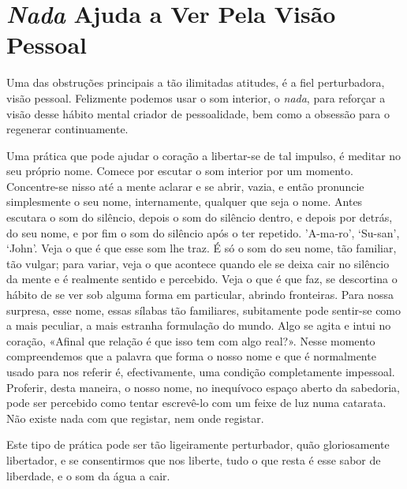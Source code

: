 \chapter{\emph{Nada} Ajuda a Ver Pela Visão Pessoal}

Uma das obstruções principais a tão ilimitadas atitudes, é a fiel
perturbadora, visão pessoal. Felizmente podemos usar o som interior, o
\emph{nada}, para reforçar a visão desse hábito mental criador de
pessoalidade, bem como a obsessão para o regenerar continuamente.

Uma prática que pode ajudar o coração a libertar-se de tal impulso, é
meditar no seu próprio nome. Comece por escutar o som interior por um
momento. Concentre-se nisso até a mente aclarar e se abrir, vazia, e
então pronuncie simplesmente o seu nome, internamente, qualquer que seja
o nome. Antes escutara o som do silêncio, depois o som do silêncio
dentro, e depois por detrás, do seu nome, e por fim o som do silêncio
após o ter repetido. 'A-ma-ro', `Su-san', `John'. Veja o que é que esse
som lhe traz. É só o som do seu nome, tão familiar, tão vulgar; para
variar, veja o que acontece quando ele se deixa cair no silêncio da
mente e é realmente sentido e percebido. Veja o que é que faz, se
descortina o hábito de se ver sob alguma forma em particular, abrindo
fronteiras. Para nossa surpresa, esse nome, essas sílabas tão
familiares, subitamente pode sentir-se como a mais peculiar, a mais
estranha formulação do mundo. Algo se agita e intui no coração, «Afinal
que relação é que isso tem com algo real?». Nesse momento compreendemos
que a palavra que forma o nosso nome e que é normalmente usado para nos
referir é, efectivamente, uma condição completamente impessoal.
Proferir, desta maneira, o nosso nome, no inequívoco espaço aberto da
sabedoria, pode ser percebido como tentar escrevê-lo com um feixe de luz
numa catarata. Não existe nada com que registar, nem onde registar.

Este tipo de prática pode ser tão ligeiramente perturbador, quão
gloriosamente libertador, e se consentirmos que nos liberte, tudo o que
resta é esse sabor de liberdade, e o som da água a cair.

